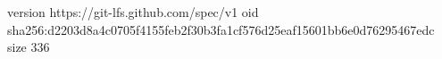 version https://git-lfs.github.com/spec/v1
oid sha256:d2203d8a4c0705f4155feb2f30b3fa1cf576d25eaf15601bb6e0d76295467edc
size 336
